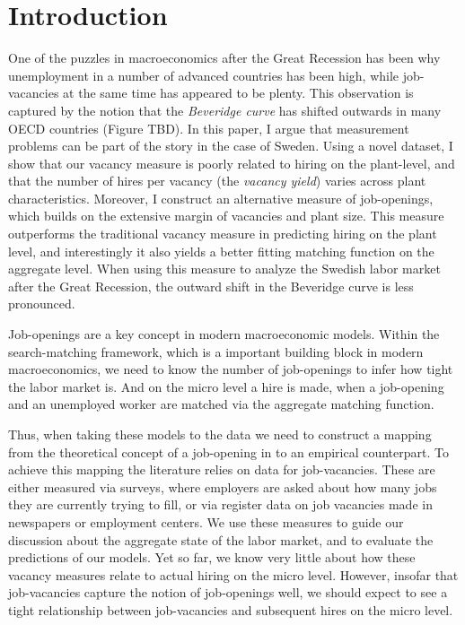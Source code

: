 \section{Introduction}

One of the puzzles in macroeconomics after the Great Recession has been why unemployment in a number of advanced countries has been high, while job-vacancies at the same time has appeared to be plenty. This observation is captured by the notion that the \emph{Beveridge curve} has shifted outwards in many OECD countries (Figure TBD). In this paper, I argue that measurement problems can be part of the story in the case of Sweden. Using a novel dataset, I show that our vacancy measure is poorly related to hiring on the plant-level, and that the number of hires per vacancy (the \emph{vacancy yield}) varies across plant characteristics. Moreover, I construct an alternative measure of job-openings, which builds on the extensive margin of vacancies and plant size. This measure outperforms the traditional vacancy measure in predicting hiring on the plant level, and interestingly it also yields a better fitting matching function on the aggregate level. When using this measure to analyze the Swedish labor market after the Great Recession, the outward shift in the Beveridge curve is less pronounced. 

Job-openings are a key concept in modern macroeconomic models. Within the search-matching framework, which is a important building block in modern macroeconomics, we need to know the number of job-openings to infer how tight the labor market is. And on the micro level a hire is made, when a job-opening and an unemployed worker are matched via the aggregate matching function.

Thus, when taking these models to the data we need to construct a mapping from the theoretical concept of a job-opening in to an empirical counterpart. To achieve this mapping the literature relies on data for job-vacancies. These are either measured via surveys, where employers are asked about how many jobs they are currently trying to fill, or via register data on job vacancies made in newspapers or employment centers. We use these measures to guide our discussion about the aggregate state of the labor market, and to evaluate the predictions of our models. Yet so far, we know very little about how these vacancy measures relate to actual hiring on the micro level. However, insofar that job-vacancies capture the notion of job-openings well, we should expect to see a tight relationship between job-vacancies and subsequent hires on the micro level. 

